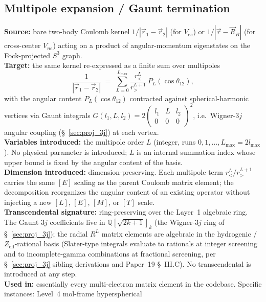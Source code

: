 \subsection{Multipole expansion / Gaunt termination}
\label{sec:proj_multipole_gaunt}
\textbf{Source:} bare two-body Coulomb kernel $1/|\vec{r}_1 - \vec{r}_2|$
(for $V_{ee}$) or $1/|\vec{r} - \vec{R}_B|$ (for cross-center $V_{ne}$)
acting on a product of angular-momentum eigenstates on the Fock-projected
$S^3$ graph.\\
\textbf{Target:} the same kernel re-expressed as a finite sum over
multipoles
\begin{equation*}
  \frac{1}{|\vec{r}_1 - \vec{r}_2|}
  \;=\; \sum_{L=0}^{L_\text{max}}
        \frac{r_<^L}{r_>^{L+1}}\, P_L(\cos\theta_{12}),
\end{equation*}
with the angular content $P_L(\cos\theta_{12})$ contracted against
spherical-harmonic vertices via Gaunt integrals
$G(l_1, L, l_2) = 2 \begin{pmatrix} l_1 & L & l_2 \\ 0 & 0 & 0
\end{pmatrix}^{\!2}$, i.e.\ Wigner-$3j$ angular coupling
(\S~\ref{sec:proj_3j}) at each vertex.\\
\textbf{Variables introduced:} the multipole order $L$ (integer, runs
$0, 1, \dots, L_\text{max} = 2 l_\text{max}$).  No physical parameter
is introduced; $L$ is an internal summation index whose upper bound is
fixed by the angular content of the basis.\\
\textbf{Dimension introduced:} dimension-preserving.  Each multipole
term $r_<^L / r_>^{L+1}$ carries the same $[E]$ scaling as the parent
Coulomb matrix element; the decomposition reorganizes the angular
content of an existing operator without injecting a new $[L]$, $[E]$,
$[M]$, or $[T]$ scale.\\
\textbf{Transcendental signature:} ring-preserving over the Layer~1
algebraic ring.  The Gaunt $3j$ coefficients live in
$\mathbb{Q}[\sqrt{2k{+}1}]_k$ (the Wigner-$3j$ ring of
\S~\ref{sec:proj_3j}); the radial $R^L$ matrix elements are algebraic
in the hydrogenic / $Z_\text{eff}$-rational basis (Slater-type
integrals evaluate to rationals at integer screening and to
incomplete-gamma combinations at fractional screening, per
\S~\ref{sec:proj_3j} sibling derivations and Paper~19 \S~III.C).  No
transcendental is introduced at any step.\\
\textbf{Used in:} essentially every multi-electron matrix element in
the codebase.  Specific instances: Level~4 mol-frame hyperspherical

